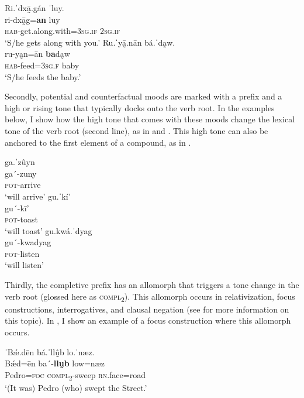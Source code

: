 \documentclass[output=paper,colorlinks=true, citecolor=brown]{langscibook}
\begin{document}
\ea\label{ex:zap:3}
    \ea\label{ex:zap:3a}
        \glll  Ri.ˈdxā̰.gán ˈluy. \\ 
              ri-dxā̰g=\textbf{an} luy\\
              \textsc{hab}{}-get.along.with=\textsc{3sg.if} 2\textsc{sg}.\textsc{if} \\
        \glt ‘S/he gets along with you.’
    \ex\label{ex:zap:3b}
        \glll  Ru.ˈyā̰.nān bá.ˈda̰w.\\
             ru-ya̰n=ān \textbf{ba}da̰w\\
              \textsc{hab}{}-feed=\textsc{3sg.f} baby\\
        \glt ‘S/he feeds the baby.’
    \z
\z 

Secondly, potential and counterfactual moods are marked with a prefix and a high or rising tone that typically docks onto the verb root. In the examples below, I show how the high tone that comes with these moods change the lexical tone of the verb root (second line), as in  and . This high tone can also be anchored to the first element of a compound, as in .

\ea\label{ex:zap:4}
    \ea\label{ex:zap:4a}
        \glll  ga.ˈzûyn\\ 
              ga´-zuny\\
              \textsc{pot}{}-arrive\\
        \glt ‘will arrive’
    \ex\label{ex:zap:4b}
        \glll  gu.ˈkí’\\ 
            gu´-kī’\\
            \textsc{pot}{}-toast\\
        \glt ‘will toast’
    \ex\label{ex:zap:4c}
        \glll  gu.kwá.ˈdyag\\
        gu´-kwadyag\\
        \textsc{pot}{}-listen\\
        \glt ‘will listen’
    \z
\z 

Thirdly, the completive prefix has an allomorph that triggers a tone change in the verb root (glossed here as \textsc{compl}\textsubscript{2}). This allomorph occurs in relativization, focus constructions, interrogatives, and clausal negation (see \citealt{GutiérrezEtAl2021} for more information on this topic). In , I show an example of a focus construction where this allomorph occurs.

\ea\label{ex:zap:5} 
    \glll ˈBǽ.dēn bá.ˈllṵ̂b lo.ˈnæz.\\ 
          Bǽd=ēn ba´-\textbf{llṵb} low=næz\\
          Pedro=\textsc{foc} \textsc{compl}\textsc{\textsubscript{2}}{}-sweep \textsc{rn}.face=road\\
    \glt ‘(It was) Pedro (who) swept the Street.’%
\z 
\end{document}
